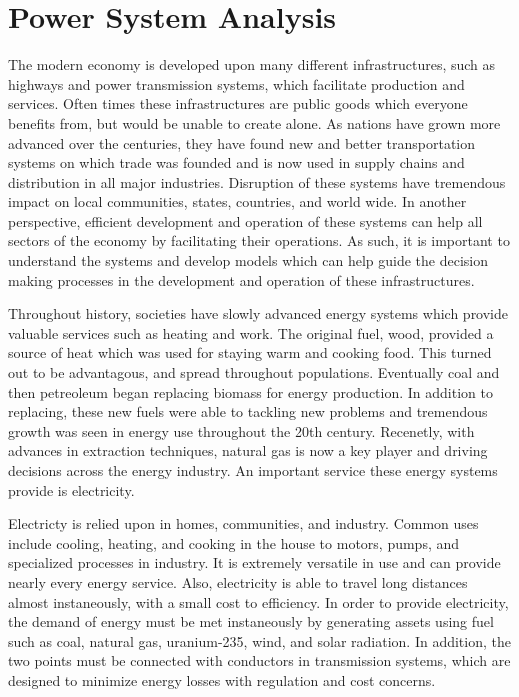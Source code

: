 

\chapter{Power System Analysis}
 
The modern economy is developed upon many different infrastructures, such as highways and power transmission systems, which facilitate production and services.  Often times these infrastructures are public goods which everyone benefits from, but would be unable to create alone.  As nations have grown more advanced over the centuries, they have found new and better transportation systems on which trade was founded and is now used in supply chains and distribution in all major industries.  Disruption of these systems have tremendous impact on local communities, states, countries, and world wide.  In another perspective, efficient development and operation of these systems can help all sectors of the economy by facilitating their operations.  As such, it is important to understand the systems and develop models which can help guide the decision making processes in the development and operation of these infrastructures.

Throughout history, societies have slowly advanced energy systems which provide valuable services such as heating and work.  The original fuel, wood, provided a source of heat which was used for staying warm and cooking food.  This turned out to be advantagous, and spread throughout populations.  Eventually coal and then petreoleum began replacing biomass for energy production.  In addition to replacing, these new fuels were able to tackling new problems and tremendous growth was seen in energy use throughout the 20th century.  Recenetly, with advances in extraction techniques, natural gas is now a key player and driving decisions across the energy industry.  An important service these energy systems provide is electricity.

Electricty is relied upon in homes, communities, and industry.  Common uses include cooling, heating, and cooking in the house to motors, pumps, and specialized processes in industry. It is extremely versatile in use and can provide nearly every energy service.  Also, electricity is able to travel long distances almost instaneously, with a small cost to efficiency.  In order to provide electricity, the demand of energy must be met instaneously by generating assets using fuel such as coal, natural gas, uranium-235, wind, and solar radiation.  In addition, the two points must be connected with conductors in transmission systems, which are designed to minimize energy losses with regulation and cost concerns.

